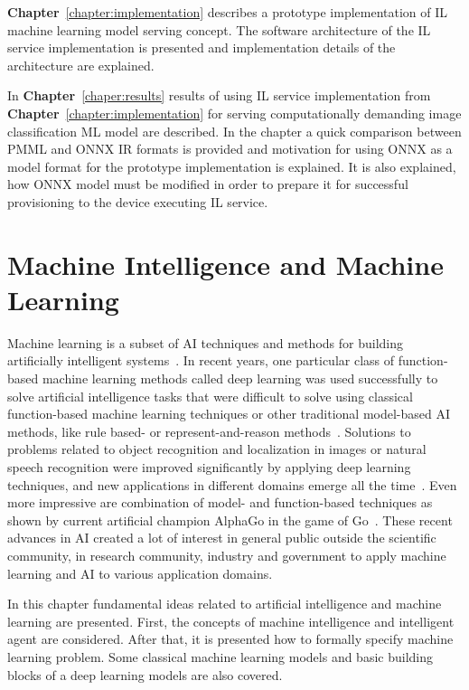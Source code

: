 \documentclass[english, 12pt, a4paper, elec, utf8, online]{aaltothesis}
\begin{document}
\textbf{Chapter}~\ref{chapter:implementation} describes a prototype implementation of IL machine learning model serving concept. The software architecture of the IL service  implementation is presented and implementation details of the architecture are explained.

In \textbf{Chapter}~\ref{chaper:results} results of using IL service implementation from \textbf{Chapter}~\ref{chapter:implementation} for serving computationally demanding image classification ML model   
are described. In the chapter a quick comparison between PMML and ONNX IR formats is provided and motivation for using ONNX as a model format for the prototype implementation is explained. It is also explained, how ONNX model must be modified in order to prepare it for successful provisioning to the device executing IL service.           

\clearpage
\section{Machine Intelligence and Machine Learning}\label{chapter:ml_theory}
Machine learning is a subset of AI techniques and methods for building artificially intelligent systems~\cite{Jung2018}. In recent years, one particular class of function-based machine learning methods called deep learning was used successfully to solve artificial intelligence tasks that were difficult to solve using classical function-based machine learning techniques or other traditional model-based AI methods, like rule based- or represent-and-reason methods~\cite{Goodfellow-et-al-2016, Darwiche17}. Solutions to problems related to object recognition and localization in images or natural speech recognition were improved significantly by applying deep learning techniques, and new applications in different domains emerge all the time~\cite{lecun2015deep}. Even more impressive are combination of model- and function-based techniques as shown by current artificial champion AlphaGo in the game of Go~\cite{Darwiche17, silver2017mastering}. These recent advances in AI created a lot of interest in general public outside the scientific community, in research community, industry and government to apply machine learning and AI to various application domains. 

In this chapter fundamental ideas related to artificial intelligence and machine learning are presented. First, the concepts of machine intelligence and intelligent agent are considered. After that, it is presented how to formally specify machine learning problem. Some classical machine learning models and basic building blocks of a deep learning models are also covered.       
\end{document}
